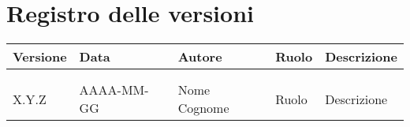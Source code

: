 \section*{Registro delle versioni}

\begin{tabular}{|C{1.7cm}|C{2cm}|C{3.5cm}|C{2.9cm}|L{3.6cm}|}
    \hline
    \textbf{Versione} & \textbf{Data} & \textbf{Autore} & \textbf{Ruolo} & \textbf{Descrizione} \\
        \hline
        &  &  &  &  \\
        \hline
        &  &  &  &  \\
        \hline
        X.Y.Z & AAAA-MM-GG & Nome Cognome & Ruolo & Descrizione \\
        \hline
\end{tabular}